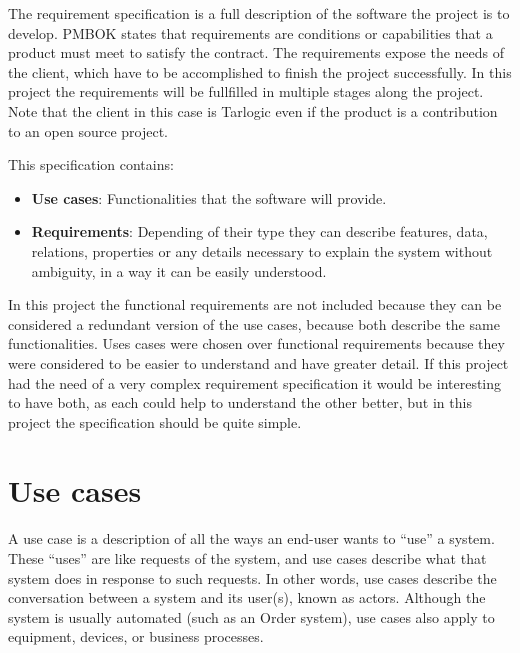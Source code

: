 


The requirement specification is a full description of the software the project is to develop.
\linej
PMBOK\cite{pmbok} states that requirements are conditions or capabilities that a product must meet to satisfy the contract.
The requirements expose the needs of the client, which have to be accomplished to finish the project successfully.
In this project the requirements will be fullfilled in multiple stages along the project.
\linej
Note that the client in this case is Tarlogic even if the product is a contribution to an open source project.

\linej
\linej
This specification contains:
\begin{itemize}
	\item \textbf{Use cases}: Functionalities that the software will provide.
	\item \textbf{Requirements}: Depending of their type they can describe features, data, relations, properties or any details necessary to explain the system without ambiguity, in a way it can be easily understood.
\end{itemize}

In this project the functional requirements are not included because they can be considered a redundant version of the use cases, because both describe the same functionalities.
Uses cases were chosen over functional requirements because they were considered to be easier to understand and have greater detail. If this project had the need of a very complex requirement specification it would be interesting to have both, as each could help to understand the other better, but in this project the specification should be quite simple.






\section{Use cases}
A use case is a description of all the ways an end-user wants to ``use'' a system. These ``uses'' are like requests of the system, and use cases describe what that system does in response to such requests. In other words, use cases describe the conversation between a system and its user(s), known as actors. Although the system is usually automated (such as an Order system), use cases also apply to equipment, devices, or business processes.\cite{use_case_definition}



